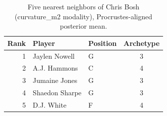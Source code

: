 \begin{table}[htbp]
  \centering\small
  \begin{tabular}{rllc}
    \toprule
    Rank & Player & Position & Archetype \\
    \midrule
    1 & Jaylen Nowell & G & 3 \\
    2 & A.J. Hammons & C & 4 \\
    3 & Jumaine Jones & G & 3 \\
    4 & Shaedon Sharpe & G & 3 \\
    5 & D.J. White & F & 4 \\
    \bottomrule
  \end{tabular}
  \caption{Five nearest neighbors of Chris Bosh (curvature_m2 modality), Procrustes-aligned posterior mean.}
  \label{tab:Chris_Bosh_neighbors_curvature_m2}
\end{table}

